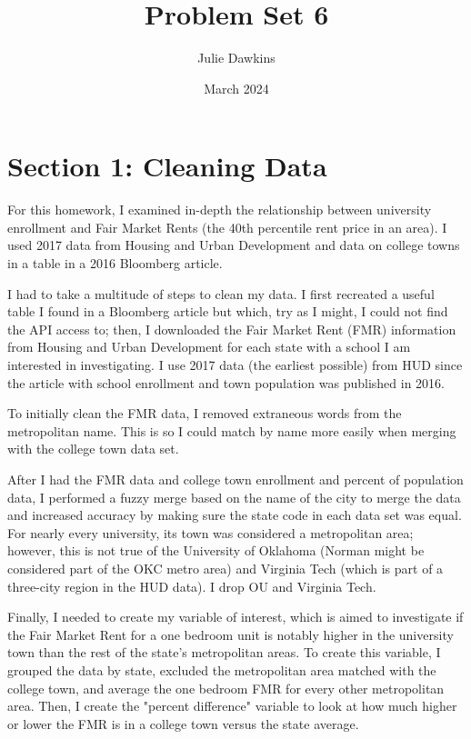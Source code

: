 \documentclass[12pt]{article}
\title{Problem Set 6}
\author{Julie Dawkins}
\date{March 2024}
\begin{document}
\maketitle

\section*{Section 1: Cleaning Data}
For this homework, I examined in-depth the relationship between university enrollment and Fair Market Rents (the 40th percentile rent price in an area). I used 2017 data from Housing and Urban Development and data on college towns in a table in a 2016 Bloomberg article. 

I had to take a multitude of steps to clean my data. I first recreated a useful table I found in a Bloomberg article but which, try as I might, I could not find the API access to; then, I downloaded the Fair Market Rent (FMR) information from Housing and Urban Development for each state with a school I am interested in investigating. I use 2017 data (the earliest possible) from HUD since the article with school enrollment and town population was published in 2016.

To initially clean the FMR data, I removed extraneous words from the metropolitan name. This is so I could match by name more easily when merging with the college town data set.

After I had the FMR data and college town enrollment and percent of population data, I performed a fuzzy merge based on the name of the city to merge the data and increased accuracy by making sure the state code in each data set was equal. For nearly every university, its town was considered a metropolitan area; however, this is not true of the University of Oklahoma (Norman might be considered part of the OKC metro area) and Virginia Tech (which is part of a three-city region in the HUD data). I drop OU and Virginia Tech. 

Finally, I needed to create my variable of interest, which is aimed to investigate if the Fair Market Rent for a one bedroom unit is notably higher in the university town than the rest of the state's metropolitan areas. To create this variable, I grouped the data by state, excluded the metropolitan area matched with the college town, and average the one bedroom FMR for every other metropolitan area. Then, I create the "percent difference" variable to look at how much higher or lower the FMR is in a college town versus the state average. 
\end{document}
